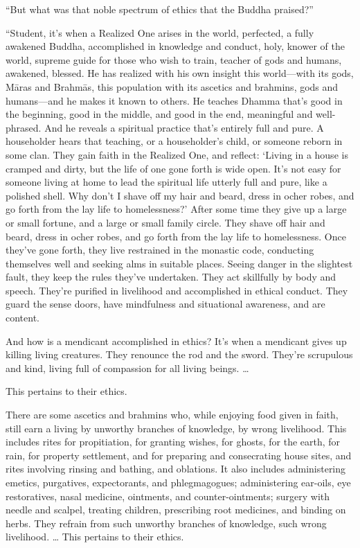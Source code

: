 \documentclass[12pt,openany]{book}%
\begin{document}
“But what was that noble spectrum of ethics that the Buddha praised?” 

“Student, it’s when a Realized One arises in the world, perfected, a fully awakened Buddha, accomplished in knowledge and conduct, holy, knower of the world, supreme guide for those who wish to train, teacher of gods and humans, awakened, blessed. He has realized with his own insight this world—with its gods, \textsanskrit{Māras} and \textsanskrit{Brahmās}, this population with its ascetics and brahmins, gods and humans—and he makes it known to others. He teaches Dhamma that’s good in the beginning, good in the middle, and good in the end, meaningful and well-phrased. And he reveals a spiritual practice that’s entirely full and pure. A householder hears that teaching, or a householder’s child, or someone reborn in some clan. They gain faith in the Realized One, and reflect: ‘Living in a house is cramped and dirty, but the life of one gone forth is wide open. It’s not easy for someone living at home to lead the spiritual life utterly full and pure, like a polished shell. Why don’t I shave off my hair and beard, dress in ocher robes, and go forth from the lay life to homelessness?’ After some time they give up a large or small fortune, and a large or small family circle. They shave off hair and beard, dress in ocher robes, and go forth from the lay life to homelessness. Once they’ve gone forth, they live restrained in the monastic code, conducting themselves well and seeking alms in suitable places. Seeing danger in the slightest fault, they keep the rules they’ve undertaken. They act skillfully by body and speech. They’re purified in livelihood and accomplished in ethical conduct. They guard the sense doors, have mindfulness and situational awareness, and are content. 

And how is a mendicant accomplished in ethics? It’s when a mendicant gives up killing living creatures. They renounce the rod and the sword. They’re scrupulous and kind, living full of compassion for all living beings. … 

This pertains to their ethics. 

There are some ascetics and brahmins who, while enjoying food given in faith, still earn a living by unworthy branches of knowledge, by wrong livelihood. This includes rites for propitiation, for granting wishes, for ghosts, for the earth, for rain, for property settlement, and for preparing and consecrating house sites, and rites involving rinsing and bathing, and oblations. It also includes administering emetics, purgatives, expectorants, and phlegmagogues; administering ear-oils, eye restoratives, nasal medicine, ointments, and counter-ointments; surgery with needle and scalpel, treating children, prescribing root medicines, and binding on herbs. They refrain from such unworthy branches of knowledge, such wrong livelihood. … This pertains to their ethics. 
\end{document}
